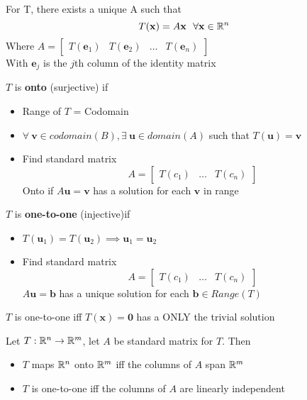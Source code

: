 \documentclass{report}
\begin{document}
\begin{theorem}
\end{theorem}
For T, there exists a unique A such that
\[
T(\mathbf{x}) = A \mathbf{x}\ \ \forall \mathbf{x} \in \mathbb{R}^n\\
\]
Where $A = \begin{bmatrix} T(\mathbf{e}_1) & T(\mathbf{e}_2) & \dots & T(\mathbf{e}_n) \end{bmatrix}$\\
With $\mathbf{e}_j$ is the $j$th column of the identity matrix


\begin{definition}
\end{definition}
$T$ is \textbf{onto} (surjective) if
\begin{itemize}
    \item Range of $T$ = Codomain
    \item $\forall \ \mathbf{v} \in codomain (B), \exists \ 
    \mathbf{u} \in domain (A)$ such that $T(\mathbf{u})=\mathbf{v}$
    \item Find standard matrix 
    \[
    A = \begin{bmatrix}
        T(c_1) & \ldots & T(c_n)
    \end{bmatrix}
    \]
    Onto if $A \mathbf{u} = \mathbf{v}$ has a solution for each $\mathbf{v}$ in range
\end{itemize}

\begin{definition}
\end{definition}
$T$ is \textbf{one-to-one} (injective)if
\begin{itemize}
    \item $T(\mathbf{u}_1) = T(\mathbf{u}_2) \implies \mathbf{u}_1 = \mathbf{u}_2$
    \item Find standard matrix 
    \[
    A = \begin{bmatrix}
        T(c_1) & \ldots & T(c_n)
    \end{bmatrix}
    \]
    $A \mathbf{u} = \mathbf{b}$ has a unique solution for each $\mathbf{b} \in Range(T)$
\end{itemize}

\begin{theorem}
    $T$ is one-to-one iff $T(\mathbf{x}) = \mathbf{0}$ has a ONLY the trivial solution
\end{theorem}

\begin{theorem}
    Let $T: \mathbb{R}^n \to \mathbb{R}^m$, let $A$ be standard matrix for $T$. Then 
    \begin{itemize}
        \item $T$ maps $\mathbb{R}^n$ onto $\mathbb{R}^m$ iff the columns of $A$ span $\mathbb{R}^m$
        \item $T$ is one-to-one iff the columns of $A$ are linearly independent
    \end{itemize}
\end{theorem}
\end{document}
